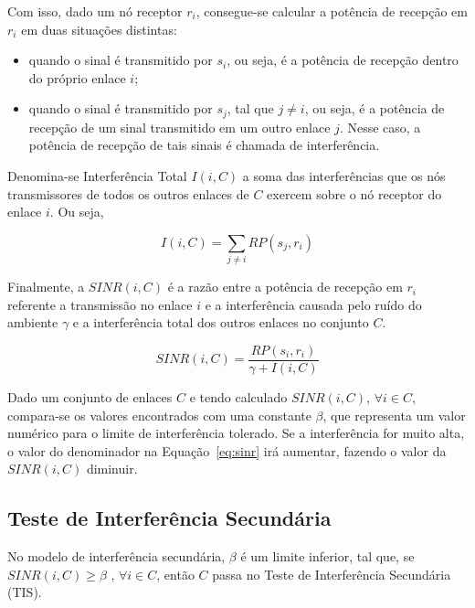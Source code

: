 Com isso, dado um nó receptor $r_{i}$, consegue-se calcular a potência de recepção em $r_{i}$ em duas situações distintas:

\begin{itemize} %

\item quando o sinal é transmitido por $s_{i}$, ou seja, é a potência de recepção dentro do próprio enlace $i$; 
\item quando o sinal é transmitido por $s_{j}$, tal que $j \neq i$, ou seja, é a potência de recepção de um sinal transmitido em um outro enlace $j$. Nesse caso, a potência de recepção de tais sinais é chamada de interferência. 

\end{itemize}

Denomina-se Interferência Total $I(i,C)$ a soma das interferências que os nós transmissores de todos os outros enlaces de $C$ exercem sobre o nó receptor do enlace $i$. Ou seja,

\begin{equation}
I(i,C) = \sum_{j \neq i} RP(s_{j},r_{i})
\end{equation}

Finalmente, a $SINR(i,C)$ é a razão entre a potência de recepção em $r_{i}$ referente a transmissão no enlace $i$ e a interferência causada pelo ruído do ambiente $\gamma$ e a interferência total dos outros enlaces no conjunto $C$.

\begin{equation}
SINR(i,C) = \frac{RP(s_{i},r_{i})} {\gamma + I(i,C)}
\label{eq:sinr}  
\end{equation}

Dado um conjunto de enlaces $C$ e tendo calculado $SINR(i,C)$, $\forall i \in C$, compara-se os valores encontrados com uma constante $\beta$, que representa um valor numérico para o limite de interferência tolerado. Se a interferência for muito alta, o valor do denominador na Equação~\ref{eq:sinr} irá aumentar, fazendo o valor da $SINR(i,C)$ diminuir. 

\subsection{Teste de Interferência Secundária}

No modelo de interferência secundária, $\beta$ é um limite inferior, tal que, se $SINR(i,C) \geq \beta$ , $\forall i \in C$, então $C$ passa no Teste de Interferência Secundária (TIS).

